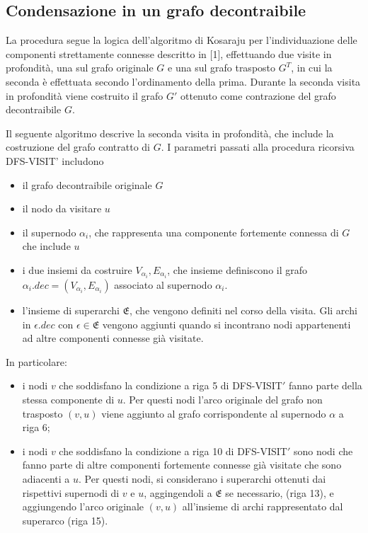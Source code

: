 \subsection{Condensazione in un grafo decontraibile}\label{subsec:condensazione-grafo-decontraibile}

La procedura segue la logica dell'algoritmo di Kosaraju per l'individuazione delle componenti strettamente connesse
descritto in [1], effettuando due visite in profondit\`a, una sul grafo originale $G$ e una sul grafo trasposto
$G^T$, in cui la seconda \`e effettuata secondo l'ordinamento della prima.
Durante la seconda visita in profondit\`a viene costruito il grafo $G\mathcal{'}$ ottenuto come contrazione del
grafo decontraibile $G$.

    Il seguente algoritmo descrive la seconda visita in profondit\`a, che include la costruzione del grafo
    contratto di $G$. \newline
    I parametri passati alla procedura ricorsiva DFS-VISIT' includono
    \begin{itemize}
        \item il grafo decontraibile originale  $G$
        \item il nodo da  visitare $u$
        \item il supernodo $\alpha_i$, che rappresenta una componente fortemente connessa di $G$ che include $u$
        \item i due insiemi da costruire $V_{\alpha_i}, E_{\alpha_i}$, che insieme definiscono il grafo $\alpha_i.dec = (V_{\alpha_i}, E_{\alpha_i})$ 
		associato al supernodo $\alpha_i$.
	    \item l'insieme di superarchi $\mathfrak{E}$, che vengono definiti nel corso della visita.
		Gli archi in $\epsilon.dec$ con $\epsilon \in \mathfrak{E}$ vengono aggiunti quando si incontrano nodi appartenenti
        ad altre componenti connesse gi\`a visitate.
    \end{itemize}

    
    

    \newpage

    \newpage
    In particolare:
    \begin{itemize}
        \item i nodi $v$ che soddisfano la condizione a riga 5 di DFS-VISIT$\mathcal{'}$ fanno parte della stessa componente di $u$.
        Per questi nodi l'arco originale del grafo non trasposto $(v, u)$ viene aggiunto al grafo corrispondente al
        supernodo $\alpha$ a riga 6;
        \item i nodi $v$ che soddisfano la condizione a riga 10 di DFS-VISIT$\mathcal{'}$ sono nodi che fanno parte di altre
        componenti fortemente connesse gi\`a visitate che sono adiacenti a $u$.
        Per questi nodi, si considerano i superarchi ottenuti dai rispettivi supernodi di $v$ e $u$, aggingendoli a
	    $\mathfrak{E}$ se necessario, (riga 13), e aggiungendo l'arco originale $(v, u)$ all'insieme di archi
        rappresentato dal superarco (riga 15).
    \end{itemize}

